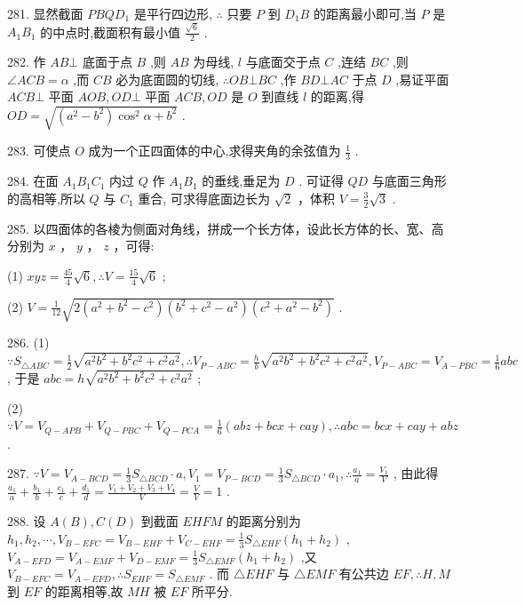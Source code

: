 \documentclass[10pt]{article}
\begin{document}
281. 显然截面 \({PBQ}{D}_{1}\) 是平行四边形, \(\therefore\) 只要 \(P\) 到 \({D}_{1}B\) 的距离最小即可,当 \(P\) 是 \({A}_{1}{B}_{1}\) 的中点时,截面积有最小值 \(\frac{\sqrt{6}}{2}\) .

282. 作 \({AB} \bot\) 底面于点 \(B\) ,则 \({AB}\) 为母线, \(l\) 与底面交于点 \(C\) ,连结 \({BC}\) ,则 \(\angle {ACB} = \alpha\) ,而 \({CB}\) 必为底面圆的切线, \(\therefore {OB} \bot  {BC}\) ,作 \({BD} \bot  {AC}\) 于点 \(D\) ,易证平面 \({ACB} \bot\) 平面 \({AOB},{OD} \bot\) 平面 \({ACB},{OD}\) 是 \(O\) 到直线 \(l\) 的距离,得 \({OD} = \sqrt{\left( {{a}^{2} - {b}^{2}}\right) {\cos }^{2}\alpha  + {b}^{2}}\) .

283. 可使点 \(O\) 成为一个正四面体的中心,求得夹角的余弦值为 \(\frac{1}{3}\) .

284. 在面 \({A}_{1}{B}_{1}{C}_{1}\) 内过 \(Q\) 作 \({A}_{1}{B}_{1}\) 的垂线,垂足为 \(D\) . 可证得 \({QD}\) 与底面三角形的高相等,所以 \(Q\) 与 \({C}_{1}\) 重合, 可求得底面边长为 \(\sqrt{2}\) ，体积 \(V = \frac{3}{2}\sqrt{3}\) .

285. 以四面体的各棱为侧面对角线，拼成一个长方体，设此长方体的长、宽、高分别为 \(x\) ， \(y\) ， \(z\) ，可得:

(1) \({xyz} = \frac{45}{4}\sqrt{6},\therefore V = \frac{15}{4}\sqrt{6}\) ;

(2) \(V = \frac{1}{12}\sqrt{2\left( {{a}^{2} + {b}^{2} - {c}^{2}}\right) \left( {{b}^{2} + {c}^{2} - {a}^{2}}\right) \left( {{c}^{2} + {a}^{2} - {b}^{2}}\right) }\) .

286. (1) \(\because {S}_{\bigtriangleup {ABC}} = \frac{1}{2}\sqrt{{a}^{2}{b}^{2} + {b}^{2}{c}^{2} + {c}^{2}{a}^{2}},\therefore {V}_{P - {ABC}} = \frac{h}{b}\sqrt{{a}^{2}{b}^{2} + {b}^{2}{c}^{2} + {c}^{2}{a}^{2}},{V}_{P - {ABC}} = {V}_{A - {PBC}} = \frac{1}{6}{abc}\) , 于是 \({abc} = h\sqrt{{a}^{2}{b}^{2} + {b}^{2}{c}^{2} + {c}^{2}{a}^{2}}\) ;

(2) \(\because V = {V}_{Q - {APB}} + {V}_{Q - {PBC}} + {V}_{Q - {PCA}} = \frac{1}{6}\left( {{abz} + {bcx} + {cay}}\right) ,\therefore {abc} = {bcx} + {cay} + {abz}\) .

287. \(\because V = {V}_{A - {BCD}} = \frac{1}{3}{S}_{\bigtriangleup {BCD}} \cdot  a,{V}_{1} = {V}_{P - {BCD}} = \frac{1}{3}{S}_{\bigtriangleup {BCD}} \cdot  {a}_{1},\therefore \frac{{a}_{1}}{a} = \frac{{V}_{1}}{V}\) , 由此得 \(\frac{{a}_{1}}{a} + \frac{{b}_{1}}{b} + \frac{{c}_{1}}{c} + \frac{{d}_{1}}{d} = \frac{{V}_{1} + {V}_{2} + {V}_{3} + {V}_{4}}{V} = \frac{V}{V} = 1\) .

288. 设 \(A\left( B\right) ,C\left( D\right)\) 到截面 \({EHFM}\) 的距离分别为 \({h}_{1},{h}_{2},\cdots ,{V}_{B - {EFC}} = {V}_{B - {EHF}} + {V}_{C - {EHF}} = \frac{1}{3}{S}_{\bigtriangleup {EHF}}\left( {{h}_{1} + {h}_{2}}\right)\) , \({V}_{A - {EFD}} = {V}_{A - {EMF}} + {V}_{D - {EMF}} = \frac{1}{3}{S}_{\bigtriangleup {EMF}}\left( {{h}_{1} + {h}_{2}}\right)\) ,又 \({V}_{B - {EFC}} = {V}_{A - {EFD}},\therefore {S}_{EHF} = {S}_{\bigtriangleup {EMF}}\) . 而 \(\bigtriangleup {EHF}\) 与 \(\bigtriangleup {EMF}\) 有公共边 \({EF},\therefore H,M\) 到 \({EF}\) 的距离相等,故 \({MH}\) 被 \({EF}\) 所平分.
\end{document}
